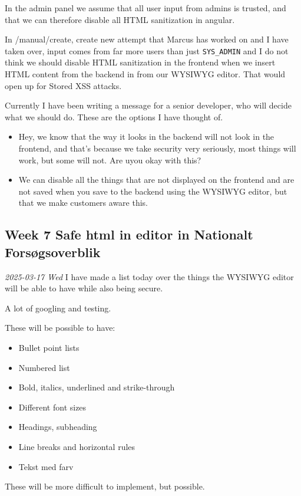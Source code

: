 \documentclass[../main.tex]{subfiles}
\begin{document}
In the admin panel we assume that all user input from admins is trusted, and that we can therefore disable all HTML sanitization in angular.

In /manual/create, create new attempt that Marcus has worked on and I have taken over, input comes from far more users than just \verb|SYS_ADMIN| and I do not think we should disable HTML sanitization in the frontend when we insert HTML content from the backend in from our WYSIWYG editor. That would open up for Stored XSS attacks.

Currently I have been writing a message for a senior developer, who will decide what we should do. These are the options I have thought of.

\begin{itemize}
    \item Hey, we know that the way it looks in the backend will not look in the frontend, and that's because we take security very seriously, most things will work, but some will not. Are uyou okay with this?
    \item We can disable all the things that are not displayed on the frontend and are not saved when you save to the backend using the WYSIWYG editor, but that we make customers aware this.
\end{itemize}




\subsection{Week 7 Safe html in editor in Nationalt Forsøgsoverblik}
\textit{2025-03-17 Wed}
I have made a list today over the things the WYSIWYG editor will be able to have while also being secure. 

A lot of googling and testing. 

These will be possible to have:
\begin{itemize}
    \item Bullet point lists
    \item Numbered list
    \item Bold, italics, underlined and strike-through
    \item Different font sizes
    \item Headings, subheading
    \item Line breaks and horizontal rules
    \item Tekst med farv
\end{itemize}

These will be more difficult to implement, but possible.
\end{document}
